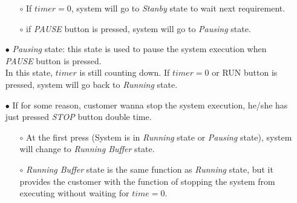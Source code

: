 \documentclass[13pt,a4paper]{article}
\begin{document}
\begin{enumerate}
\begin{enumerate}
				\item[$\circ$] If $timer = 0$, system will go to \textit{Stanby} state to wait next requirement.
				\item[$\circ$] if \textit{PAUSE} button is pressed, system will go to \textit{Pausing} state.
			\end{enumerate}	
		\item[$\bullet$] \textit{Pausing} state: this state is used to pause the system execution when \textit{PAUSE} button is pressed. \\
		In this state, $timer$ is still counting down. If $timer = 0$ or RUN button is pressed, system will go back to \textit{Running} state.
		\item[$\bullet$] If for some reason, customer wanna stop the system execution, he/she has just pressed \textit{STOP} button double time. 
			\begin{enumerate}
				\item[$\circ$] At the first press (System is in \textit{Running} state or \textit{Pausing} state), system will change to \textit{Running Buffer} state. 
				\item[$\circ$] \textit{Running Buffer} state is the same function as \textit{Running} state, but it provides the customer with the function of stopping the system from executing without waiting for $time = 0$.
			\end{enumerate}
	\end{enumerate}
\end{document}
